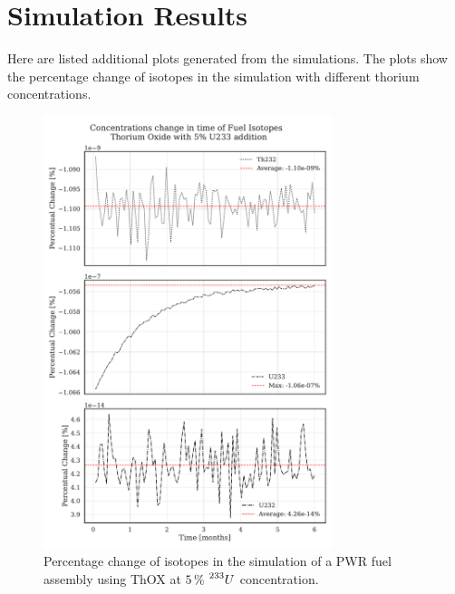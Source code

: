 \appendix

\chapter{Simulation Results}

Here are listed additional plots generated from the simulations. The plots show the percentage change of isotopes in the simulation with different thorium concentrations. 

\begin{figure}[h]
    \centering
    \includegraphics[width=0.75\textwidth, height=0.75\textheight]{Kap7/Figures_Kap7/percentual_change_th232_U233_5.pdf}
    \caption{Percentage change of isotopes in the simulation of a PWR fuel assembly using ThOX at \(5 \, \%\) \(\prescript{233}{}{U}\) concentration.}
    \label{fig:th_u233_5}
\end{figure}

